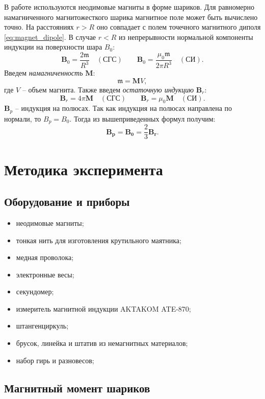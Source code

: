 \documentclass[12pt,a4paper]{article}
\begin{document}
	В работе используются неодимовые магниты в форме шариков.
	Для равномерно намагниченного магнитожесткого шарика магнитное поле может быть вычислено точно. На расстояниях $r > R$ оно совпадает с полем точечного магнитного диполя \eqref{eq:magnet_dipole}. В случае $r < R$ из непрерывности нормальной компоненты индукции на поверхности шара $B_0$:
	$$ \boldsymbol{B}_0 = \frac{2\mathfrak{m}}{R^3} \quad (\text{СГС}) \qquad 
	\boldsymbol{B}_0 = \frac{\mu_0 \mathfrak{m}}{2 \pi R^3} \quad (\text{СИ}). $$
	Введем \textit{намагниченность} $\boldsymbol{M} $:
	$$ \mathfrak{m} = \boldsymbol{M} V,$$
	где $V$ -- объем магнита.
	Также введем \textit{остаточную индукцию} $\boldsymbol{B}_r$:
	$$ \boldsymbol{B}_r = 4 \pi \boldsymbol{M} \quad (\text{СГС}) \qquad
	\boldsymbol{B}_r = \mu_0 \boldsymbol{M} \quad (\text{СИ}). $$
	$\boldsymbol{B}_p$ -- индукция на полюсах. Так как индукция на полюсах направлена по нормали, то $B_p = B_0$. Тогда из вышеприведенных формул получим: 
	$$ \boldsymbol{B_p} = \boldsymbol{B_0} = \frac{2}{3} \boldsymbol{B_r}. $$
	
	\section*{Методика эксперимента}
	
	\subsection*{Оборудование и приборы}
	\begin{itemize}[itemsep = 0pt, parsep=0pt]
		\item неодимовые магниты;
		\item тонкая нить для изготов­ления крутильного маятника;
		\item медная проволока;
		\item электронные весы;
		\item секундомер;
		\item измеритель магнитной индукции AKTAKOM ATE-870;
		\item штангенциркуль;
		\item брусок, линейка и штатив из немагнитных материалов;
		\item набор гирь и разновесов;
	\end{itemize}
	
	\subsection*{Магнитный момент шариков}
		
\end{document}
